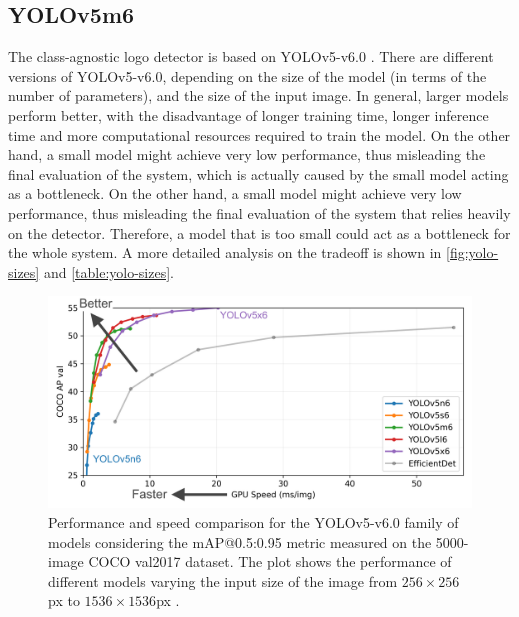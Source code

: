 \subsection{YOLOv5m6}
The class-agnostic logo detector is based on YOLOv5-v6.0 \cite{glenn_jocher_2021_5563715}. There are different versions of YOLOv5-v6.0, depending on the size of the model (in terms of the number of parameters), and the size of the input image. In general, larger models perform better, with the disadvantage of longer training time, longer inference time and more computational resources required to train the model. On the other hand, a small model might achieve very low performance, thus misleading the final evaluation of the system, which is actually caused by the small model acting as a bottleneck. On the other hand, a small model might achieve very low performance, thus misleading the final evaluation of the system that relies heavily on the detector. Therefore, a model that is too small could act as a bottleneck for the whole system. A more detailed analysis on the tradeoff is shown in \autoref{fig:yolo-sizes} and \autoref{table:yolo-sizes}.

\begin{figure}%
	\centering

    \begin{center}
        \includegraphics[width=\columnwidth]{images/yolov5-sizes.png}
    \end{center}

	\caption{Performance and speed comparison for the YOLOv5-v6.0 family of models considering the mAP@0.5:0.95 metric measured on the 5000-image COCO val2017 \cite{lin2014microsoft} dataset. The plot shows the performance of different models varying the input size of the image from $256 \times 256$px to $1536 \times 1536$px \cite{glenn_jocher_2021_5563715}.}
	\label{fig:yolo-sizes}%
\end{figure}


